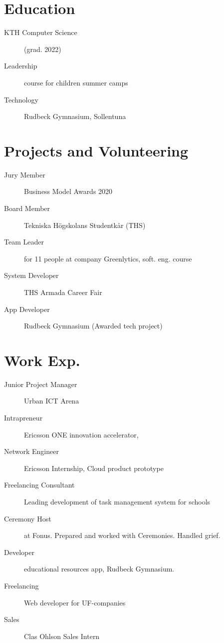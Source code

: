 \documentclass[margin,line,a4paper]{resume}
\begin{document}
\begin{resume}
\section{\mysidestyle Education}\vspace{1mm}
    \begin{description}
        \item[KTH Computer Science] (grad. 2022)
         \item[Leadership] course for children summer camps
        \item[Technology] Rudbeck Gymnasium, Sollentuna
    \end{description} 

\section{\mysidestyle Projects and Volunteering}\vspace{1mm}
\begin{description}
    \item[Jury Member] Business Model Awards 2020 
    \item[Board Member] Tekniska Högskolans Studentkår (THS) 
    \item[Team Leader] for 11 people at company Greenlytics, soft. eng. course  
     \item[System Developer] THS Armada Career Fair
    \item[App Developer] Rudbeck Gymnasium (Awarded tech project) 

\end{description}  
  
\section{\mysidestyle Work Exp.}\vspace{1mm}
\begin{description}
   \item[Junior Project Manager] Urban ICT Arena
    \item[Intrapreneur] Ericsson ONE innovation accelerator, 
    \item[Network Engineer] Ericsson Internship, Cloud product prototype
    \item[Freelancing Consultant] Leading development of task management system for schools
    \item[Ceremony Host] at Fonus. Prepared and worked with Ceremonies. Handled grief.
    \item[Developer] educational resources app, Rudbeck Gymnasium.
    \item[Freelancing] Web developer for UF-companies
    \item[Sales] Clas Ohlson Sales Intern
\end{description}


\end{resume}
\end{document}
